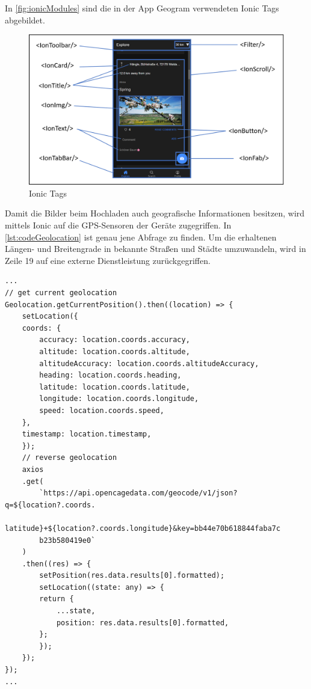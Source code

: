In \autoref{fig:ionicModules} sind die in der App \glqq Geogram\grqq{} verwendeten Ionic Tags abgebildet.

\begin{figure}[H]
    \centering
    \includegraphics[width=.8\linewidth]{images/ionicModules.png}
    \caption{Ionic Tags}
    \label{fig:ionicModules}
\end{figure}

Damit die Bilder beim Hochladen auch geografische Informationen besitzen, wird mittels Ionic auf die GPS-Sensoren der Geräte zugegriffen. In \autoref{lst:codeGeolocation} ist genau jene Abfrage zu finden. Um die erhaltenen Längen- und Breitengrade in bekannte Straßen und Städte umzuwandeln, wird in Zeile 19 auf eine externe Dienstleistung zurückgegriffen.

\begin{lstlisting}[label=lst:codeGeolocation, caption={Implementierung der GPS-Abfrage}, captionpos=b, breaklines=true]
...
// get current geolocation
Geolocation.getCurrentPosition().then((location) => {
    setLocation({
    coords: {
        accuracy: location.coords.accuracy,
        altitude: location.coords.altitude,
        altitudeAccuracy: location.coords.altitudeAccuracy,
        heading: location.coords.heading,
        latitude: location.coords.latitude,
        longitude: location.coords.longitude,
        speed: location.coords.speed,
    },
    timestamp: location.timestamp,
    });
    // reverse geolocation
    axios
    .get(
        `https://api.opencagedata.com/geocode/v1/json?q=${location?.coords.
        latitude}+${location?.coords.longitude}&key=bb44e70b618844faba7c
        b23b580419e0`
    )
    .then((res) => {
        setPosition(res.data.results[0].formatted);
        setLocation((state: any) => {
        return {
            ...state,
            position: res.data.results[0].formatted,
        };
        });
    });
});
...
\end{lstlisting}

